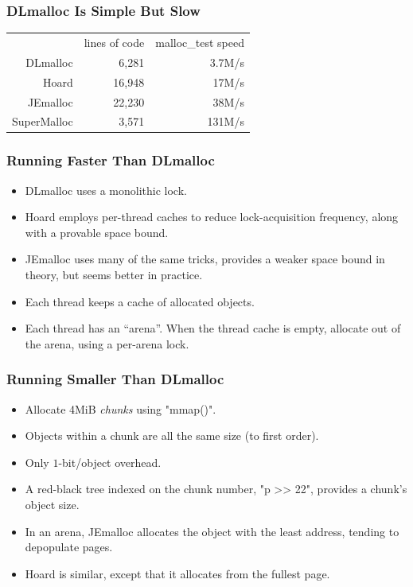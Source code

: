 \documentclass[xcolor=dvipsnames,14pt]{beamer}
\begin{document}
\begin{frame}
\frametitle{DLmalloc Is Simple But Slow}

\begin{tabular}{rrr}
         & lines of code & malloc\_test speed \\
DLmalloc &    6,281 &  3.7M/s \\
Hoard    &   16,948 &  17M/s \\
JEmalloc    & 22,230 & 38M/s\\
SuperMalloc & 3,571 & 131M/s \\
\end{tabular}

\end{frame}

\begin{frame}
\frametitle{Running Faster Than DLmalloc}

\begin{itemize}
\item DLmalloc uses a monolithic lock.
\item Hoard employs per-thread caches to reduce lock-acquisition frequency, along with a provable space bound.
\item JEmalloc uses many of the same tricks, provides a weaker space bound in theory, but seems better in practice.
\item Each thread keeps a cache of allocated objects.
\item Each thread has an ``arena''.  When the thread cache is empty, allocate out of the arena, using a per-arena lock.
\end{itemize}

\end{frame}

\begin{frame}[fragile]
\frametitle{Running Smaller Than DLmalloc}

\begin{itemize}
\item Allocate 4MiB \textit{chunks} using "mmap()".
\item Objects within a chunk are all the same size (to first order).
\item Only $1$-bit/object overhead.
\item A red-black tree indexed on the chunk number, "p >> 22", provides a chunk's object size.
\item In an arena, JEmalloc allocates the object with the least address,
tending to depopulate pages.
\item Hoard is similar, except that it allocates from the fullest page.
\end{itemize}
\end{frame}
\end{document}
